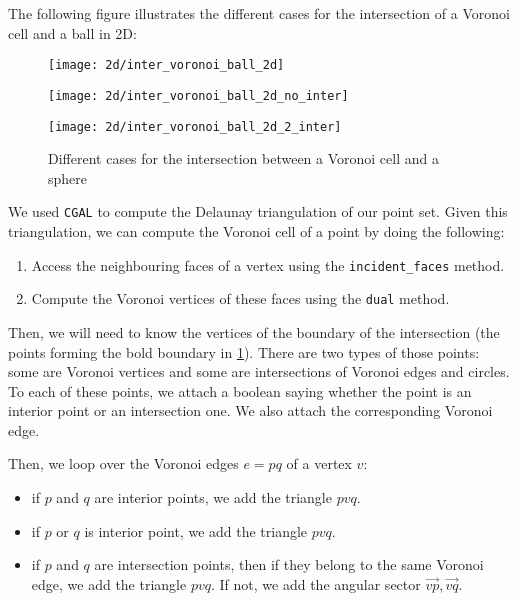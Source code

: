 The following figure illustrates the different cases for the intersection of a
Voronoi cell and a ball in 2D:
\begin{figure}[H]
    \centering
    \begin{minipage}{0.32\linewidth}
        \centering
        \texttt{[image: 2d/inter\_voronoi\_ball\_2d]}
        \label{fig:inter_voronoi_ball_2d:a}
    \end{minipage}
    \begin{minipage}{0.32\linewidth}
        \centering
        \texttt{[image: 2d/inter\_voronoi\_ball\_2d\_no\_inter]}
        \label{fig:inter_voronoi_ball_2d:b}
    \end{minipage}
    \begin{minipage}{0.32\linewidth}
        \centering
        \texttt{[image: 2d/inter\_voronoi\_ball\_2d\_2\_inter]}
        \label{fig:inter_voronoi_ball_2d:c}
    \end{minipage}

   \caption{Different cases for the intersection between a Voronoi cell and a sphere}
   \label{fig:inter_voronoi_ball_2d}
\end{figure}

We used \texttt{CGAL} to compute the Delaunay triangulation of our point set.
Given this triangulation, we can compute the Voronoi cell of a point by doing
the following:
\begin{enumerate}
    \item Access the neighbouring faces of a vertex using the
        \texttt{incident\_faces} method.
    \item Compute the Voronoi vertices of these faces using the \texttt{dual}
        method.
\end{enumerate}

Then, we will need to know the vertices of the boundary of the intersection (the
points forming the bold boundary in \ref{fig:inter_voronoi_ball_2d}). There are
two types of those points: some are Voronoi vertices and some are intersections
of Voronoi edges and circles. To each of these points, we attach a boolean
saying whether the point is an interior point or an intersection one. We also
attach the corresponding Voronoi edge.

Then, we loop over the Voronoi edges $ e = pq $ of a vertex $ v $:
\begin{itemize}
    \item if $ p $ and $ q $ are interior points, we add the triangle $ pvq $.
    \item if $ p $ or $ q $ is interior point, we add the triangle $ pvq $.
    \item if $ p $ and $ q $ are intersection points, then if they belong to the
        same Voronoi edge, we add the triangle $ pvq $. If not, we add the
        angular sector $ \vec{vp}, \vec{vq} $.
\end{itemize}

